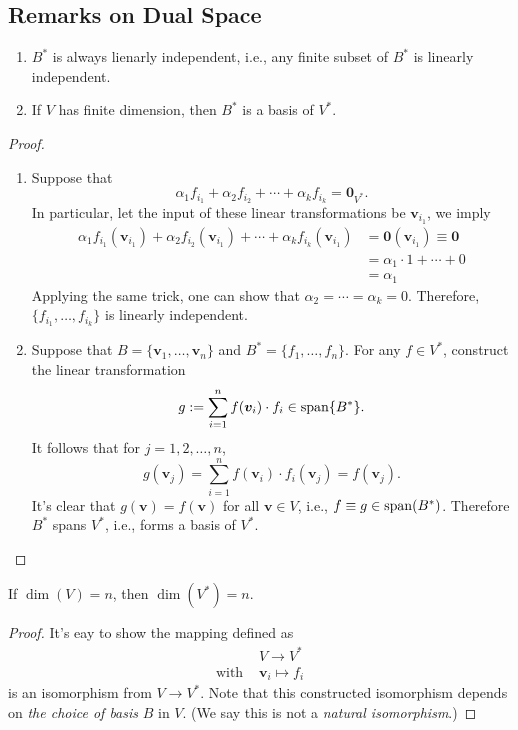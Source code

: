 \subsection{Remarks on Dual Space}
\begin{proposition}\label{pro:5:1}
\begin{enumerate}
\item
$B^*$ is always lienarly independent, i.e., any finite subset of $B^*$ is linearly independent.
\item
If $V$ has finite dimension, then $B^*$ is a basis of $V^*$.
\end{enumerate}

\end{proposition}
\begin{proof}
\begin{enumerate}
\item
Suppose that 
\[
\alpha_1 f_{i_1}+\alpha_2 f_{i_2}+\cdots+\alpha_k f_{i_k} = \bm0_{V^*}.
\]
In particular, let the input of these linear transformations be $\bm v_{i_1}$, we imply
\begin{align*}
\alpha_1 f_{i_1}(\bm v_{i_1})+\alpha_2 f_{i_2}(\bm v_{i_1})+\cdots+\alpha_k f_{i_k}(\bm v_{i_1}) &= \bm0(\bm v_{i_1})\equiv\bm0\\
&=\alpha_1\cdot1+\cdots+0\\
&=\alpha_1
\end{align*}
Applying the same trick, one can show that $\alpha_2=\cdots=\alpha_k=0$. 
Therefore, $\{f_{i_1},\dots,f_{i_k}\}$ is linearly independent.
\item
Suppose that $B=\{\bm v_1,\dots,\bm v_n\}$ and $B^*=\{f_1,\dots,f_n\}$.
For any $f\in V^*$, construct the linear transformation
\[
g:=\sum_{i=1}^nf(\bm v_i)\cdot f_i\in\operatorname{span}\{B^*\}.
\]
It follows that for $j=1,2,\dots,n$,
\[
g(\bm v_j) = \sum_{i=1}^nf(\bm v_i)\cdot f_i(\bm v_j) = f(\bm v_j).
\]
It's clear that $g(\bm v) = f(\bm v)$ for all $\bm v\in V$, i.e., $f\equiv g\in\operatorname{span}(B^*)$.
Therefore $B^*$ spans $V^*$, i.e., forms a basis of $V^*$.
\end{enumerate}
\end{proof}

\begin{corollary}
If $\dim(V)=n$, then $\dim(V^*)=n$.
\end{corollary}
\begin{proof}
It's eay to show the mapping defined as
\[
\begin{array}{ll}
&V\to V^*\\
\text{with }&\bm v_i\mapsto f_i
\end{array}
\]
is an isomorphism from $V\to V^*$.
Note that this constructed isomorphism depends on \emph{the choice of basis} $B$ in $V$. (We say this is not a \emph{natural isomorphism}.)
\end{proof}

